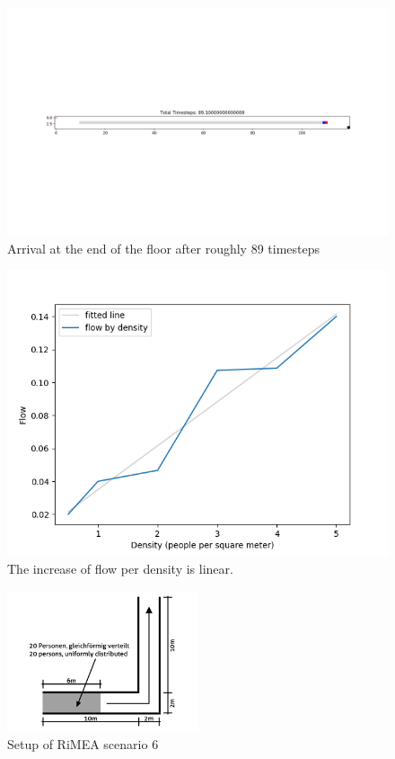\documentclass[10pt,a4paper]{article}
\begin{document}
\begin{figure}
    \centering
    \includegraphics[width=\textwidth]{pictures/test1_end.png}
    \caption{Arrival at the end of the floor after roughly 89 timesteps}
    \label{fig:result_test1}
\end{figure}
\begin{figure}
    \centering
    \includegraphics[width=\textwidth]{pictures/test2result.png}
    \caption{The increase of flow per density is linear.}
    \label{fig:test2_result}
\end{figure}
\begin{figure}
    \centering
    \includegraphics[width=0.5\textwidth]{pictures/corner.png}
    \caption{Setup of RiMEA scenario 6}
    \label{fig:corner}
\end{figure}
\end{document}
